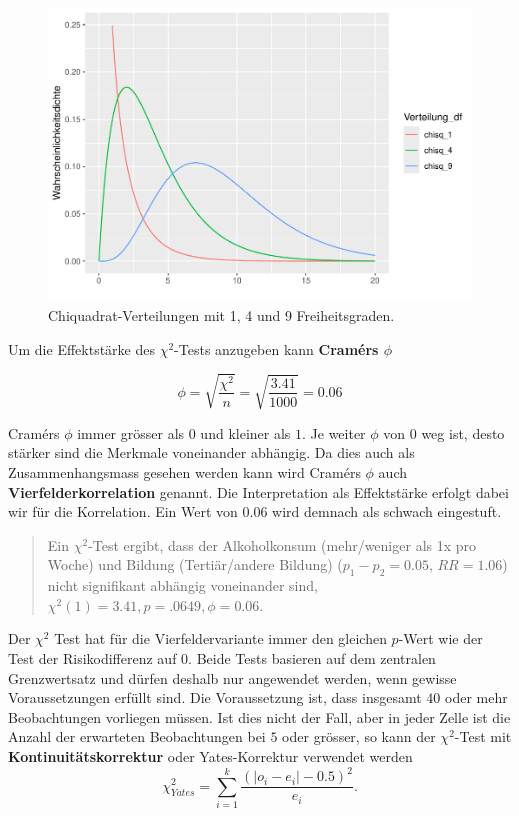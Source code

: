 \documentclass[
]{book}
\theoremstyle{definition}
\theoremstyle{definition}
\theoremstyle{definition}
\theoremstyle{definition}
\theoremstyle{remark}
\begin{document}
\begin{figure}

{\centering \includegraphics{aps_statistik1_files/figure-latex/chisq-distribution-1} 

}

\caption{Chiquadrat-Verteilungen mit 1, 4 und 9 Freiheitsgraden.}\label{fig:chisq-distribution}
\end{figure}

\label{customdef-cramers-phi}{Um die Effektstärke des \(\chi^2\)-Tests anzugeben kann \textbf{Cramérs \(\phi\)}}

\[\phi = \sqrt{\frac{\chi^2}{n}} = \sqrt{\frac{3.41}{1000}} = 0.06\]

Cramérs \(\phi\) immer grösser als \(0\) und kleiner als \(1\). Je weiter
\(\phi\) von \(0\) weg ist, desto stärker sind die Merkmale voneinander
abhängig. \label{customdef-vierfelderkorrelation}{Da dies auch als Zusammenhangsmass gesehen werden kann wird
Cramérs \(\phi\) auch \textbf{Vierfelderkorrelation} genannt.} Die Interpretation als Effektstärke erfolgt dabei wir für die Korrelation. Ein Wert von
\(0.06\) wird demnach als schwach eingestuft.

\begin{quote}
Ein \(\chi^2\)-Test ergibt, dass der Alkoholkonsum (mehr/weniger als 1x
pro Woche) und Bildung (Tertiär/andere Bildung) (\(p_1-p_2= 0.05\), \(RR = 1.06\)) nicht signifikant
abhängig voneinander sind,
\(\chi^2 (1) = 3.41, p = .0649, \phi = 0.06\).
\end{quote}

Der \(\chi^2\) Test hat für die Vierfeldervariante immer den gleichen
\(p\)-Wert wie der Test der Risikodifferenz auf \(0\). Beide Tests basieren
auf dem zentralen Grenzwertsatz und dürfen deshalb nur angewendet
werden, wenn gewisse Voraussetzungen erfüllt sind. Die Voraussetzung
ist, dass insgesamt \(40\) oder mehr Beobachtungen vorliegen müssen. \label{customdef-chisq-corrected}{Ist
dies nicht der Fall, aber in jeder Zelle ist die Anzahl der erwarteten
Beobachtungen bei \(5\) oder grösser, so kann der \(\chi^2\)-Test mit
\textbf{Kontinuitätskorrektur} oder Yates-Korrektur verwendet
werden}
\[\chi^2_{Yates} = \sum_{i = 1}^k \frac{(|o_i - e_i| -0.5)^2}{e_i}.\]
\end{document}

